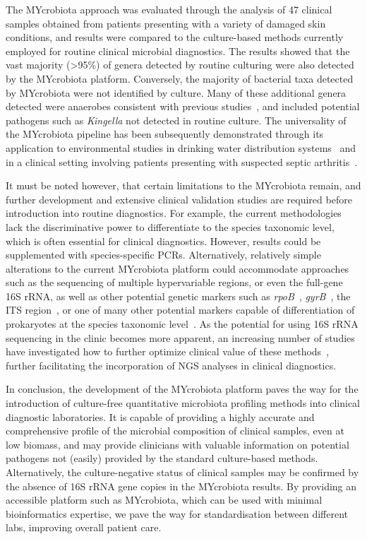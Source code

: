 The MYcrobiota approach was evaluated through the analysis of 47 clinical samples obtained from patients presenting with a variety of damaged skin conditions, and results were compared to the culture-based methods currently employed for routine clinical microbial diagnostics. The results showed that the vast majority (>95\%) of genera detected by routine culturing were also detected by the MYcrobiota platform. Conversely, the majority of bacterial taxa detected by MYcrobiota were not identified by culture. Many of these additional genera detected were anaerobes consistent with previous studies~\cite{price2009community}, and included potential pathogens such as \emph{Kingella} not detected in routine culture.
The universality of the MYcrobiota pipeline has been subsequently demonstrated through its application to environmental studies in drinking water distribution systems~\cite{boers2018monitoring} and in a clinical setting involving patients presenting with suspected septic arthritis~\cite{boers2018detection}.

It must be noted however, that certain limitations to the MYcrobiota remain, and further development and extensive clinical validation studies are required before introduction into routine diagnostics. For example, the current methodologies lack the discriminative power to differentiate to the species taxonomic level, which is often essential for clinical diagnostics. However, results could be supplemented with species-specific PCRs. Alternatively, relatively simple alterations to the current MYcrobiota platform could accommodate approaches such as the sequencing of multiple hypervariable regions, or even the full-gene 16S rRNA, as well as other potential genetic markers such as \emph{rpoB}~\cite{adekambi2009rpob}, \emph{gyrB}~\cite{yamamoto1995pcr}, the ITS region~\cite{schoch2012nuclear}, or one of many other potential markers capable of differentiation of prokaryotes at the species taxonomic level~\cite{lan2016marker,sabat2017targeted}. As the potential for using 16S rRNA sequencing in the clinic becomes more apparent, an increasing number of studies have investigated how to further optimize clinical value of these methods~\cite{Sune2020,Akram2017}, further facilitating the incorporation of NGS analyses in clinical diagnostics.

In conclusion, the development of the MYcrobiota platform paves the way for the introduction of culture-free quantitative microbiota profiling methods into clinical diagnostic laboratories. It is capable of providing a highly accurate and comprehensive profile of the microbial composition of clinical samples, even at low biomass, and may provide clinicians with valuable information on potential pathogens not (easily) provided by the standard culture-based methods. Alternatively, the culture-negative status of clinical samples may be confirmed by the absence of 16S rRNA gene copies in the MYcrobiota results.  By providing an accessible platform such as MYcrobiota, which can be used with minimal bioinformatics expertise, we pave the way for standardisation between different labs, improving overall patient care.

